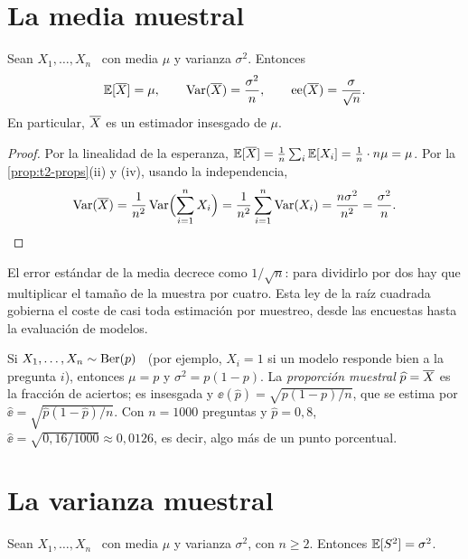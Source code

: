 \section{La media muestral}

\begin{teorema}\label{teo:t2-media}
Sean $X_1,\dots,X_n$ \iid\ con media $\mu$ y varianza $\sigma^{2}$. Entonces
\[
\mathbb{E}[\overline{X}]=\mu,\qquad \operatorname{Var}(\overline{X})=\frac{\sigma^{2}}{n},\qquad \operatorname{ee}(\overline{X})=\frac{\sigma}{\sqrt n}.
\]
En particular, $\overline{X}$ es un estimador insesgado de $\mu$.
\end{teorema}

\begin{proof}
Por la linealidad de la esperanza, $\mathbb{E}[\overline{X}]=\frac1n\sum_i\mathbb{E}[X_i]=\frac1n\cdot n\mu=\mu$. Por la \cref{prop:t2-props}(ii) y (iv), usando la independencia,
\[
\operatorname{Var}(\overline{X})=\frac{1}{n^{2}}\operatorname{Var}\Bigl(\sum_{i=1}^{n}X_i\Bigr)=\frac{1}{n^{2}}\sum_{i=1}^{n}\operatorname{Var}(X_i)=\frac{n\sigma^{2}}{n^{2}}=\frac{\sigma^{2}}{n}.\qedhere
\]
\end{proof}

El error estándar de la media decrece como $1/\sqrt n$: para dividirlo por dos hay que multiplicar el tamaño de la muestra por cuatro. Esta ley de la raíz cuadrada gobierna el coste de casi toda estimación por muestreo, desde las encuestas hasta la evaluación de modelos.

\begin{ejemplo}\label{ej:t2-proporcion}
Si $X_1,\dots,X_n\sim\operatorname{Ber}(p)$ \iid\ (por ejemplo, $X_i=1$ si un modelo responde bien a la pregunta $i$), entonces $\mu=p$ y $\sigma^{2}=p(1-p)$. La \emph{proporción muestral} $\widehat p=\overline{X}$ es la fracción de aciertos; es insesgada y $\ee(\widehat p)=\sqrt{p(1-p)/n}$, que se estima por $\widehat{\ee}=\sqrt{\widehat p(1-\widehat p)/n}$. Con $n=1000$ preguntas y $\widehat p=0{,}8$, $\widehat{\ee}=\sqrt{0{,}16/1000}\approx0{,}0126$, es decir, algo más de un punto porcentual.
\end{ejemplo}

\section{La varianza muestral}

\begin{teorema}\label{teo:t2-s2}
Sean $X_1,\dots,X_n$ \iid\ con media $\mu$ y varianza $\sigma^{2}$, con $n\ge2$. Entonces $\mathbb{E}[S^{2}]=\sigma^{2}$.
\end{teorema}

